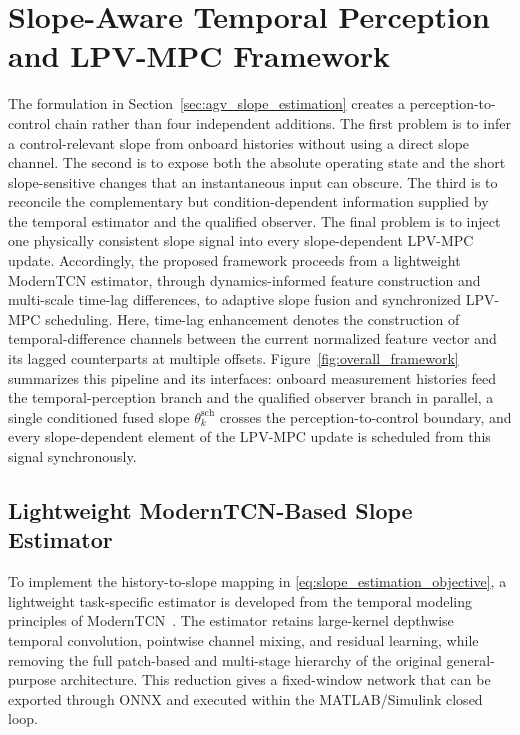 \documentclass{ieeeaccess}
\newcommand{\citep}[1]{\cite{#1}}
\begin{document}
\section{Slope-Aware Temporal Perception and LPV-MPC Framework}
\label{sec:proposed_framework}

The formulation in Section~\ref{sec:agv_slope_estimation} creates a perception-to-control chain rather than four independent additions. The first problem is to infer a control-relevant slope from onboard histories without using a direct slope channel. The second is to expose both the absolute operating state and the short slope-sensitive changes that an instantaneous input can obscure. The third is to reconcile the complementary but condition-dependent information supplied by the temporal estimator and the qualified observer. The final problem is to inject one physically consistent slope signal into every slope-dependent LPV-MPC update. Accordingly, the proposed framework proceeds from a lightweight ModernTCN estimator, through dynamics-informed feature construction and multi-scale time-lag differences, to adaptive slope fusion and synchronized LPV-MPC scheduling. Here, time-lag enhancement denotes the construction of temporal-difference channels between the current normalized feature vector and its lagged counterparts at multiple offsets. Figure~\ref{fig:overall_framework} summarizes this pipeline and its interfaces: onboard measurement histories feed the temporal-perception branch and the qualified observer branch in parallel, a single conditioned fused slope $\theta_k^{\mathrm{sch}}$ crosses the perception-to-control boundary, and every slope-dependent element of the LPV-MPC update is scheduled from this signal synchronously.

\subsection{Lightweight ModernTCN-Based Slope Estimator}

To implement the history-to-slope mapping in \eqref{eq:slope_estimation_objective}, a lightweight task-specific estimator is developed from the temporal modeling principles of ModernTCN~\citep{Luo2024ModernTCN}. The estimator retains large-kernel depthwise temporal convolution, pointwise channel mixing, and residual learning, while removing the full patch-based and multi-stage hierarchy of the original general-purpose architecture. This reduction gives a fixed-window network that can be exported through ONNX and executed within the MATLAB/Simulink closed loop.
\end{document}
